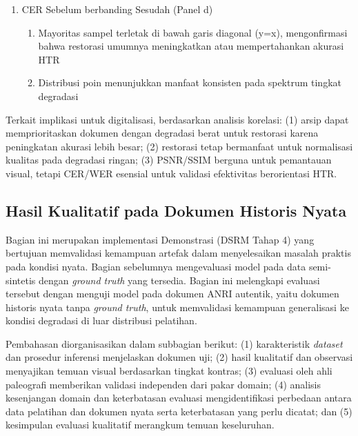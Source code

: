 \documentclass[12pt,a4paper]{article}
\begin{document}
\begin{enumerate}[leftmargin=1.5em, labelsep=0.5em, itemindent=0pt, label=\arabic*., topsep=0pt, partopsep=0pt]
    \item CER Sebelum berbanding Sesudah (Panel d)
    
    \begin{enumerate}[leftmargin=1.5em, labelsep=0.5em, itemindent=0pt, noitemsep, topsep=0pt, label=\alph*)]
        \item Mayoritas sampel terletak di bawah garis diagonal (y=x), mengonfirmasi bahwa restorasi umumnya meningkatkan atau mempertahankan akurasi HTR
        \item Distribusi poin menunjukkan manfaat konsisten pada spektrum tingkat degradasi
    \end{enumerate}
\end{enumerate}

Terkait implikasi untuk digitalisasi, berdasarkan analisis korelasi: (1) arsip dapat memprioritaskan dokumen dengan degradasi berat untuk restorasi karena peningkatan akurasi lebih besar; (2) restorasi tetap bermanfaat untuk normalisasi kualitas pada degradasi ringan; (3) PSNR/SSIM berguna untuk pemantauan visual, tetapi CER/WER esensial untuk validasi efektivitas berorientasi HTR.


\subsection{Hasil Kualitatif pada Dokumen Historis Nyata}
\label{subsec:evaluasi-kualitatif-anri}

Bagian ini merupakan implementasi Demonstrasi (DSRM Tahap 4) yang bertujuan memvalidasi kemampuan artefak dalam menyelesaikan masalah praktis pada kondisi nyata. Bagian sebelumnya mengevaluasi model pada data semi-sintetis dengan \textit{ground truth} yang tersedia. Bagian ini melengkapi evaluasi tersebut dengan menguji model pada dokumen ANRI autentik, yaitu dokumen historis nyata tanpa \textit{ground truth}, untuk memvalidasi kemampuan generalisasi ke kondisi degradasi di luar distribusi pelatihan.

Pembahasan diorganisasikan dalam subbagian berikut: (1) karakteristik \textit{dataset} dan prosedur inferensi menjelaskan dokumen uji; (2) hasil kualitatif dan observasi menyajikan temuan visual berdasarkan tingkat kontras; (3) evaluasi oleh ahli paleografi memberikan validasi independen dari pakar domain; (4) analisis kesenjangan domain dan keterbatasan evaluasi mengidentifikasi perbedaan antara data pelatihan dan dokumen nyata serta keterbatasan yang perlu dicatat; dan (5) kesimpulan evaluasi kualitatif merangkum temuan keseluruhan.
\end{document}
